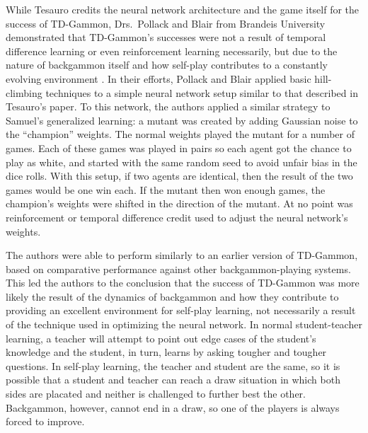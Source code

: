 While Tesauro credits the neural network architecture and the game itself for
the success of TD-Gammon,
Drs.\ Pollack and Blair from Brandeis University demonstrated that
TD-Gammon's successes were not a result of
temporal difference learning
or even reinforcement learning necessarily,
but due to the nature of backgammon itself and how self-play contributes to a
constantly evolving environment
\cite{why-td-gammon}.
%
In their efforts,
Pollack and Blair applied basic hill-climbing techniques to a simple neural
network setup similar to that described in Tesauro's paper.
%
To this network,
the authors applied a similar strategy to Samuel's generalized learning:
a mutant was created by adding Gaussian noise to the ``champion'' weights.
%
The normal weights played the mutant for a number of games.
%
Each of these games was played in pairs
so each agent got the chance to play as white,
and started with the same random seed to avoid unfair bias in the dice rolls.
%
With this setup,
if two agents are identical,
then the result of the two games would be one win each.
%
If the mutant then won enough games,
the champion's weights were shifted in the direction of the mutant.
%
At no point was reinforcement or temporal difference credit used to adjust the
neural network's weights.

The authors were able to perform similarly to an earlier version of TD-Gammon,
based on comparative performance against other backgammon-playing systems.
%
This led the authors to the conclusion that the success of TD-Gammon was
more likely
the result of the dynamics of backgammon and how they contribute to providing an
excellent environment for self-play learning,
not necessarily a result of the technique used in optimizing the neural network.
%
In normal student-teacher learning,
a teacher will attempt to point out edge cases of the student's knowledge
and the student, in turn, learns by asking tougher and tougher questions.
%
In self-play learning,
the teacher and student are the same,
so it is possible that a student and teacher can reach a draw situation in which
both sides are placated and neither is challenged to further best the other.
%
Backgammon, however,
cannot end in a draw,
so one of the players is always forced to improve.

